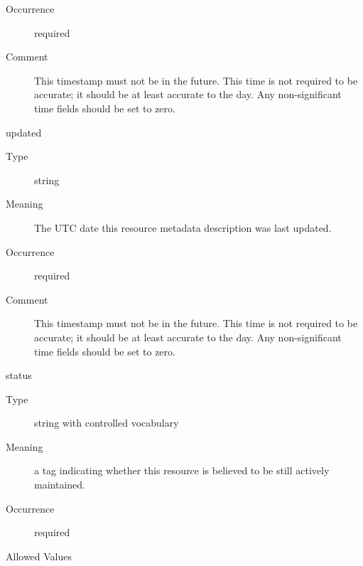 \documentclass[11pt,a4paper]{ivoa}
\begin{document}
\begin{generated}
\begin{bigdescription}
\begin{description}
\item[Occurrence] required

\item[Comment]
              This timestamp must not be in the future.  This time is
              not required to be accurate; it should be at least
              accurate to the day.  Any non-significant time fields
              should be set to zero.

\end{description}
\item[updated]
\begin{description}
\item[Type] string
\item[Meaning]
              The UTC date this resource metadata description was last updated.

\item[Occurrence] required

\item[Comment]
              This timestamp must not be in the future.  This time is
              not required to be accurate; it should be at least
              accurate to the day.  Any non-significant time fields
              should be set to zero.

\end{description}
\item[status]
\begin{description}
\item[Type] string with controlled vocabulary
\item[Meaning]
              a tag indicating whether this resource is believed to be still
              actively maintained.

\item[Occurrence] required

\item[Allowed Values]\hfil
{}
\end{description}
\end{bigdescription}
\end{generated}
\end{document}
